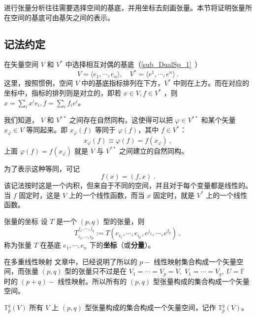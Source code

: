 
\begin{issues}
\issueDraft
\end{issues}

进行张量分析往往需要选择空间的基底，并用坐标去刻画张量。本节将证明张量所在空间的基底可由基矢之间的表示。
\subsection{记法约定}
在矢量空间 $V$ 和 $V^*$ 中选择相互对偶的基底（\autoref{sub_DualSp_1}~）
\begin{equation}
V=\langle e_1,\cdots ,e_n\rangle,\quad V^*=\langle e^1,\cdots,e^n\rangle~.
\end{equation}
这里，按照惯例，空间 $V$ 中的基底指标排列在下方，$V^*$ 中则在上方。而在对应的坐标中，指标的排列则是对立的，即若 $x\in V,f\in V^*$ ，则 $x=\sum_{i}x^i e_i,f=\sum_{i}f_ie^i$。

我们知道， $V$ 和 $V^{**}$ 之间存在自然同构，这使得可以把 $\varphi\in V^{**}$ 和某个矢量 $x_{\varphi}\in V$ 等同起来。即 $x_{\varphi}(f)$ 等同于 $\varphi(f)$，其中 $f\in V^*$：
\begin{equation}
x_{\varphi}(f)\equiv\varphi(f)=f(x_{\varphi})~,
\end{equation}
上面 $\varphi(f)=f(x_{\varphi})$ 就是 $V$ 与 $V^{**}$ 之间建立的自然同构。

为了表示这种等同，可记
\begin{equation}\label{eq_CofTen_4}
f(x)=(f,x)~.
\end{equation}
该记法按时这是一个内积，但来自于不同的空间，并且对于每个变量都是线性的。当 $f$ 固定时，这是 $V$ 上的一个线性函数，而当 $x$ 固定时，就是 $V^{*}$ 上的一个线性函数。
\begin{definition}{张量的坐标}\label{def_CofTen_2}
设 $T$ 是一个 $(p,q)$ 型的张量，则
\begin{equation}
T^{j_1,\cdots,j_q}_{i_1,\cdots,i_p}:=T(e_{i_1},\cdots,e_{i_p},e^{j_1},\cdots,e^{j_q})~,
\end{equation}
称为张量 $T$ 在基底 ${e_1,\cdots,e_n}$ 下的\textbf{坐标}（或\textbf{分量}）。
\end{definition}

在多重线性映射 文章中，已经说明了所以的 $p-$ 线性映射集合构成一个矢量空间，而张量 $(p,q)$ 型的张量只不过是在 $V_1=\cdots=V_p=V,\;V_1=\cdots=V_q,\;U=\mathbb F$ 时的 $(p+q)-$ 线性映射。所以所有的 $(p,q)$ 型张量构成的集合构成一个矢量空间。
\begin{definition}{$\mathbb T^q_p(V)$}\label{def_CofTen_1}
所有 $V$ 上 $(p,q)$ 型张量构成的集合构成一个矢量空间，记作 $\mathbb T^q_p(V)$。
\end{definition} 
